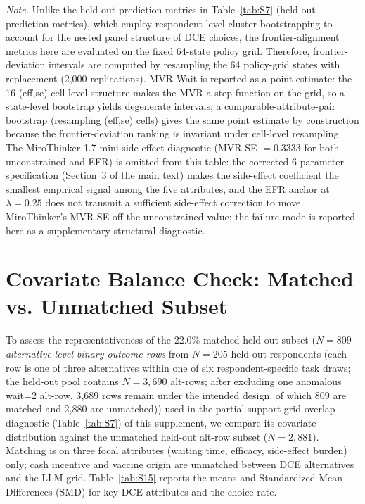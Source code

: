 \documentclass[11pt]{article}
\begin{document}
\begin{table}[t]
\vspace{0.4em}
\begin{minipage}{0.95\textwidth}
\small
\textit{Note.} Unlike the held-out prediction metrics in Table~\ref{tab:S7} (held-out prediction metrics), which employ respondent-level cluster bootstrapping to account for the nested panel structure of DCE choices, the frontier-alignment metrics here are evaluated on the fixed 64-state policy grid. Therefore, frontier-deviation intervals are computed by resampling the 64 policy-grid states with replacement (2{,}000 replications). MVR-Wait is reported as a point estimate: the 16 (eff,se) cell-level structure makes the MVR a step function on the grid, so a state-level bootstrap yields degenerate intervals; a comparable-attribute-pair bootstrap (resampling (eff,se) cells) gives the same point estimate by construction because the frontier-deviation ranking is invariant under cell-level resampling. The MiroThinker-1.7-mini side-effect diagnostic (MVR-SE $= 0.3333$ for both unconstrained and EFR) is omitted from this table: the corrected 6-parameter specification (Section~3 of the main text) makes the side-effect coefficient the smallest empirical signal among the five attributes, and the EFR anchor at $\lambda = 0.25$ does not transmit a sufficient side-effect correction to move MiroThinker's MVR-SE off the unconstrained value; the failure mode is reported here as a supplementary structural diagnostic.
\end{minipage}
\end{table}

\section{Covariate Balance Check: Matched vs. Unmatched Subset}
\label{app:balance_check}

To assess the representativeness of the 22.0\% matched held-out subset ($N=809$ \emph{alternative-level binary-outcome rows} from $N=205$ held-out respondents (each row is one of three alternatives within one of six respondent-specific task draws; the held-out pool contains $N=3{,}690$ alt-rows; after excluding one anomalous wait=2 alt-row, 3{,}689 rows remain under the intended design, of which 809 are matched and 2{,}880 are unmatched)) used in the partial-support grid-overlap diagnostic (Table~\ref{tab:S7}) of this supplement, we compare its covariate distribution against the unmatched held-out alt-row subset ($N=2{,}881$). Matching is on three focal attributes (waiting time, efficacy, side-effect burden) only; cash incentive and vaccine origin are unmatched between DCE alternatives and the LLM grid. Table~\ref{tab:S15} reports the means and Standardized Mean Differences (SMD) for key DCE attributes and the choice rate.
\end{document}
